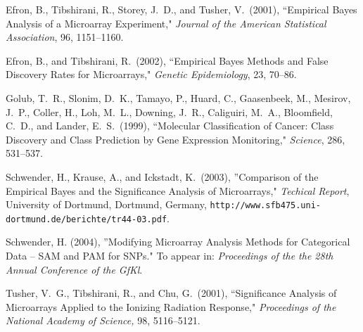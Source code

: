 \documentclass[a4paper]{article}
\begin{document}
\begin{thebibliography}{}
\item[Efron, B.,] Tibshirani, R., Storey, J.\ D., and Tusher, V.\ (2001),
``Empirical Bayes Analysis of a Microarray Experiment,"
\textit{Journal of the American Statistical Association}, 96,
1151--1160.

\item[Efron, B.,] and Tibshirani, R.\ (2002), ``Empirical Bayes Methods
and False Discovery Rates for Microarrays," \textit{Genetic
Epidemiology}, 23, 70--86.

\item[Golub, T.\ R.,] Slonim, D.\ K., Tamayo, P., Huard, C., Gaasenbeek,
M., Mesirov, J.\ P., Coller, H., Loh, M.\ L., Downing, J.\ R.,
Caliguiri, M.\ A., Bloomfield, C.\ D., and Lander, E.\ S.\ (1999),
``Molecular Classification of Cancer: Class Discovery and Class
Prediction by Gene Expression Moni\-to\-ring," \textit{Science},
286, 531--537.

\item[Schwender, H.,] Krause, A., and Ickstadt, K.\ (2003), ''Comparison of
the Empirical Bayes and the Significance Analysis of Microarrays,"
\textit{Techical Report}, University of Dortmund, Dortmund, Germany,
\texttt{http://www.sfb475.uni-dortmund.de/berichte/tr44-03.pdf}.

\item[Schwender, H.] (2004), ''Modifying Microarray Analysis Methods for
Categorical Data -- SAM and PAM for SNPs." To appear in: \emph{Proceedings
of the the 28th Annual Conference of the GfKl}.

\item[Tusher, V.\ G.,] Tibshirani, R., and Chu, G.\ (2001),
``Significance Analysis of Microarrays Applied to the Ionizing
Radiation Response," \textit{Proceedings of the National Academy
of Science,} 98, 5116--5121.

\end{thebibliography}
\end{document}
